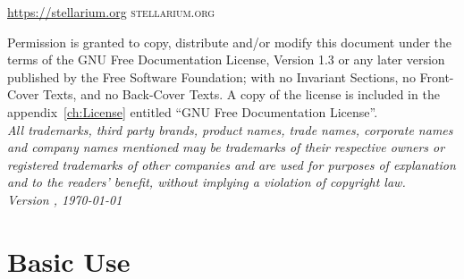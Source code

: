 \documentclass[12pt,fleqn,dvipdfmx]{book} %
\newcommand{\DocumentEdition}{1}
\begin{document}
\noindent%
\ifhtlatex
\url{https://stellarium.org}
\else
\textsc{stellarium.org}\\ %
\fi

\noindent Permission is granted to copy, distribute and/or modify 
this document under the terms of the GNU Free Documentation License, 
Version 1.3 or any later version published by the Free Software 
Foundation; with no Invariant Sections, no Front-Cover Texts, 
and no Back-Cover Texts. A copy of the license is included in 
the appendix~\ref{ch:License} entitled ``GNU Free Documentation
License''.\\ %

\small{\noindent \textit{All trademarks, third party brands, product names, trade names,
corporate names and company names mentioned may be trademarks of their
respective owners or registered trademarks of other companies and are
used for purposes of explanation and to the readers' benefit, without
implying a violation of copyright law.}}\\


\noindent \textit{Version \StelVersion-\DocumentEdition, \today} %



\pagestyle{empty} %
\ifpdf
 \tableofcontents %
\fi
\cleardoublepage %


\mainmatter
\pagestyle{fancy} %
\part{Basic Use}

\end{document}
